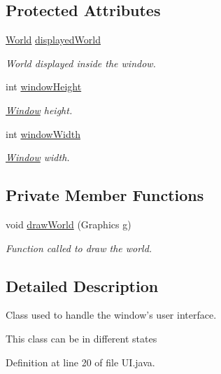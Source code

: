 \subsection*{Protected Attributes}
\begin{DoxyCompactItemize}
\item 
\hyperlink{classworld_1_1_world}{World} \hyperlink{classwindow_1_1ui_1_1_u_i_a964f2be8f2b13b25d66b571325e20757}{displayed\-World}
\begin{DoxyCompactList}\small\item\em World displayed inside the window. \end{DoxyCompactList}\item 
int \hyperlink{classwindow_1_1ui_1_1_u_i_ad1a84d64616615d037c1ebca54647610}{window\-Height}
\begin{DoxyCompactList}\small\item\em \hyperlink{classwindow_1_1_window}{Window} height. \end{DoxyCompactList}\item 
int \hyperlink{classwindow_1_1ui_1_1_u_i_a4c35432cda424d024255606d4f95caf2}{window\-Width}
\begin{DoxyCompactList}\small\item\em \hyperlink{classwindow_1_1_window}{Window} width. \end{DoxyCompactList}\end{DoxyCompactItemize}
\subsection*{Private Member Functions}
\begin{DoxyCompactItemize}
\item 
void \hyperlink{classwindow_1_1ui_1_1_u_i_ab8622a1cf2ea812537f90a9508bbe394}{draw\-World} (Graphics g)
\begin{DoxyCompactList}\small\item\em Function called to draw the world. \end{DoxyCompactList}\end{DoxyCompactItemize}


\subsection{Detailed Description}
Class used to handle the window's user interface. 

This class can be in different states 

Definition at line 20 of file U\-I.\-java.



